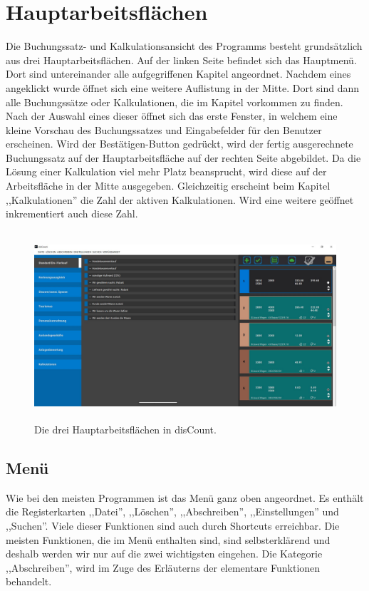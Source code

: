 \documentclass[12pt]{report}
\begin{document}
\section{Hauptarbeitsflächen}
Die Buchungssatz- und Kalkulationsansicht des Programms besteht grundsätzlich aus drei Hauptarbeitsflächen. Auf der linken Seite befindet sich das Hauptmenü. Dort sind untereinander alle aufgegriffenen Kapitel angeordnet. Nachdem eines angeklickt wurde öffnet sich eine weitere Auflistung in der Mitte. Dort sind dann alle Buchungssätze oder Kalkulationen, die im Kapitel vorkommen zu finden. Nach der Auswahl eines dieser öffnet sich das erste Fenster, in welchem eine kleine Vorschau des Buchungssatzes und Eingabefelder für den Benutzer erscheinen. Wird der Bestätigen-Button gedrückt, wird der fertig ausgerechnete Buchungssatz auf der Hauptarbeitsfläche auf der rechten Seite abgebildet. Da die Lösung einer Kalkulation viel mehr Platz beansprucht, wird diese auf der Arbeitsfläche in der Mitte ausgegeben. Gleichzeitig erscheint beim Kapitel ,,Kalkulationen'' die Zahl der aktiven Kalkulationen. Wird eine weitere geöffnet inkrementiert auch diese Zahl.

\begin{figure}[h]
	\centering
	\includegraphics[height=7cm]{images/hauptarbeitsflaechen}
	\caption[Hauptarbeitsflächen]{Die drei Hauptarbeitsflächen in disCount.}
\end{figure}


\subsection{Menü}
Wie bei den meisten Programmen ist das Menü ganz oben angeordnet. Es enthält die Registerkarten ,,Datei'', ,,Löschen'', ,,Abschreiben'', ,,Einstellungen'' und ,,Suchen''. Viele dieser Funktionen sind auch durch Shortcuts erreichbar. Die meisten Funktionen, die im Menü enthalten sind, sind selbsterklärend und deshalb werden wir nur auf die zwei wichtigsten eingehen. Die Kategorie ,,Abschreiben'', wird im Zuge des Erläuterns der elementare Funktionen behandelt.
\end{document}
